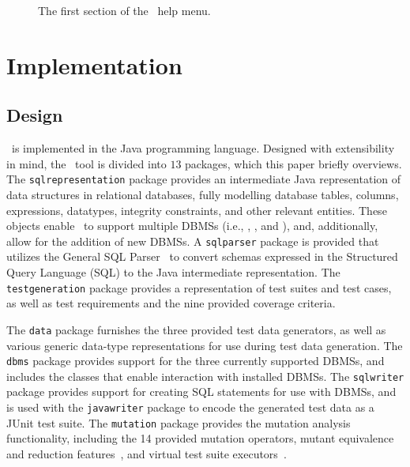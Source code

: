 \begin{figure}

\caption{\label{fig:usage} The first section of the \sa~help menu.}
\end{figure}

\section{Implementation}\label{sec:implementation}
\subsection{Design}


\sa~is implemented in the Java programming language.  Designed with extensibility in mind, the \sa~tool is divided into
$13$ packages, which this paper briefly overviews. The \texttt{sqlrepresentation} package provides an intermediate Java
representation of data structures in relational databases, fully modelling database tables, columns, expressions,
datatypes, integrity constraints, and other relevant entities. These objects enable \sa~to support multiple DBMSs (i.e.,
\sqlite, \postgres, and \hypersql), and, additionally, allow for the addition of new DBMSs. A \texttt{sqlparser} package
is provided that utilizes the General SQL Parser~\cite{generalsqlparser} to convert schemas expressed in the Structured
Query Language (SQL) to the Java intermediate representation. The \texttt{testgeneration} package provides a
representation of test suites and test cases, as well as test requirements and the nine provided coverage criteria.


The \texttt{data} package furnishes the three provided test data generators, as well as various generic data-type
representations for use during test data generation. The \texttt{dbms} package provides support for the three currently
supported DBMSs, and includes the classes that enable interaction with installed DBMSs. The \texttt{sqlwriter} package
provides support for creating SQL statements for use with DBMSs, and is used with the \texttt{javawriter} package to
encode the generated test data as a JUnit test suite.  The \texttt{mutation} package provides the mutation analysis
functionality, including the 14 provided mutation operators, mutant equivalence and reduction
features~\cite{wright2014impact}, and virtual test suite executors~\cite{mcminn2016virtual}.

